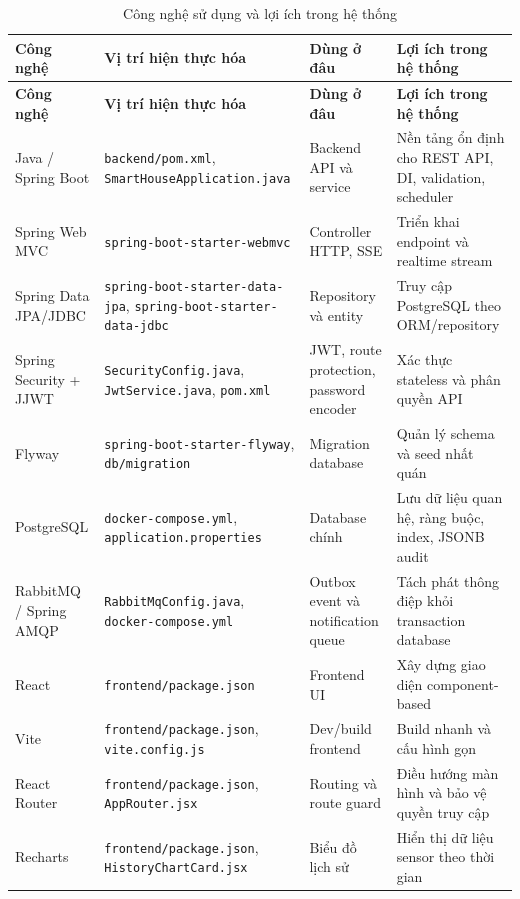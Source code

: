 {\scriptsize
\setlength{\tabcolsep}{3pt}
\renewcommand{\arraystretch}{1.12}
\begin{longtable}{|p{}|p{}|p{}|p{}|}
\caption{Công nghệ sử dụng và lợi ích trong hệ thống}\\
\hline
\textbf{Công nghệ} & \textbf{Vị trí hiện thực hóa} & \textbf{Dùng ở đâu} & \textbf{Lợi ích trong hệ thống} \\
\hline
\endfirsthead
\hline
\textbf{Công nghệ} & \textbf{Vị trí hiện thực hóa} & \textbf{Dùng ở đâu} & \textbf{Lợi ích trong hệ thống} \\
\hline
\endhead
Java / Spring Boot & \texttt{backend/pom.xml}, \texttt{SmartHouseApplication.java} & Backend API và service & Nền tảng ổn định cho REST API, DI, validation, scheduler \\
\hline
Spring Web MVC & \texttt{spring-boot-starter-webmvc} & Controller HTTP, SSE & Triển khai endpoint và realtime stream \\
\hline
Spring Data JPA/JDBC & \texttt{spring-boot-starter-data-jpa}, \texttt{spring-boot-starter-data-jdbc} & Repository và entity & Truy cập PostgreSQL theo ORM/repository \\
\hline
Spring Security + JJWT & \texttt{SecurityConfig.java}, \texttt{JwtService.java}, \texttt{pom.xml} & JWT, route protection, password encoder & Xác thực stateless và phân quyền API \\
\hline
Flyway & \texttt{spring-boot-starter-flyway}, \texttt{db/migration} & Migration database & Quản lý schema và seed nhất quán \\
\hline
PostgreSQL & \texttt{docker-compose.yml}, \texttt{application.properties} & Database chính & Lưu dữ liệu quan hệ, ràng buộc, index, JSONB audit \\
\hline
RabbitMQ / Spring AMQP & \texttt{RabbitMqConfig.java}, \texttt{docker-compose.yml} & Outbox event và notification queue & Tách phát thông điệp khỏi transaction database \\
\hline
React & \texttt{frontend/package.json} & Frontend UI & Xây dựng giao diện component-based \\
\hline
Vite & \texttt{frontend/package.json}, \texttt{vite.config.js} & Dev/build frontend & Build nhanh và cấu hình gọn \\
\hline
React Router & \texttt{frontend/package.json}, \texttt{AppRouter.jsx} & Routing và route guard & Điều hướng màn hình và bảo vệ quyền truy cập \\
\hline
Recharts & \texttt{frontend/package.json}, \texttt{HistoryChartCard.jsx} & Biểu đồ lịch sử & Hiển thị dữ liệu sensor theo thời gian \\

\end{longtable}}
